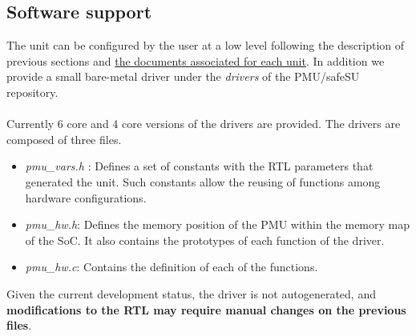 \subsection{Software support}
The unit can be configured by the user at a low level following the description of previous sections and \href{https://gitlab.bsc.es/caos_hw/hdl_ip/bsc_pmu/-/tree/develop/docs}{the documents associated for each unit}. In addition we provide a small bare-metal driver under the \textit{drivers} of the PMU/safeSU repository.\\
\\
Currently 6 core and 4 core versions of the drivers are provided. The drivers are composed of three files.
\begin{itemize}
\item \textit{pmu\_vars.h }: Defines a set of constants with the RTL parameters that generated the unit. Such constants allow the reusing of functions among hardware configurations.
\item\textit{ pmu\_hw.h}: Defines the memory position of the PMU within the memory map of the SoC. It also contains the prototypes of each function of the driver.
\item \textit{pmu\_hw.c}: Contains the definition of each of the functions.
\end{itemize}
Given the current development status, the driver is not autogenerated, and \textbf{modifications to the RTL may require manual changes on the previous files}. 

